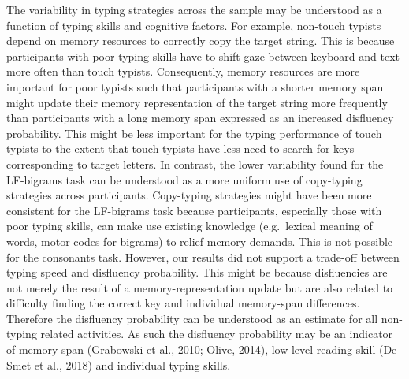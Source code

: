 \documentclass[
  english,
  man,mask,floatsintext]{apa7}
\begin{document}
The variability in typing strategies across the sample may be understood as a function of typing skills and cognitive factors. For example, non-touch typists depend on memory resources to correctly copy the target string. This is because participants with poor typing skills have to shift gaze between keyboard and text more often than touch typists. Consequently, memory resources are more important for poor typists such that participants with a shorter memory span might update their memory representation of the target string more frequently than participants with a long memory span expressed as an increased disfluency probability. This might be less important for the typing performance of touch typists to the extent that touch typists have less need to search for keys corresponding to target letters. In contrast, the lower variability found for the LF-bigrams task can be understood as a more uniform use of copy-typing strategies across participants. Copy-typing strategies might have been more consistent for the LF-bigrams task because participants, especially those with poor typing skills, can make use existing knowledge (e.g.~lexical meaning of words, motor codes for bigrams) to relief memory demands. This is not possible for the consonants task. However, our results did not support a trade-off between typing speed and disfluency probability. This might be because disfluencies are not merely the result of a memory-representation update but are also related to difficulty finding the correct key and individual memory-span differences. Therefore the disfluency probability can be understood as an estimate for all non-typing related activities. As such the disfluency probability may be an indicator of memory span (Grabowski et al., 2010; Olive, 2014), low level reading skill (De Smet et al., 2018) and individual typing skills.
\end{document}
